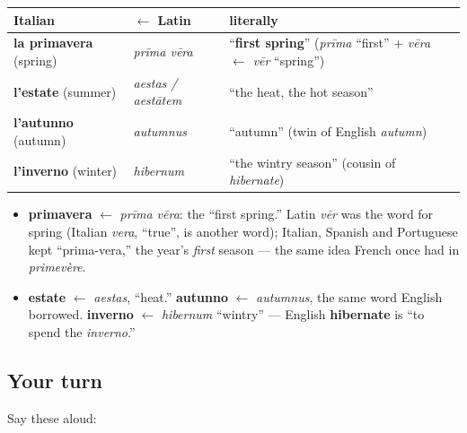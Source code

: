 \begin{cousinweb}
\noindent
\begin{tabularx}{\linewidth}{@{}>{\raggedright\arraybackslash}X>{\raggedright\arraybackslash}X>{\raggedright\arraybackslash}X@{}}
\toprule
\textbf{Italian} & \textbf{$\leftarrow$ Latin} & \textbf{literally} \\
\midrule
\textbf{la primavera} (spring) & \emph{prīma vēra} & \textquotedblleft{}\textbf{first spring}\textquotedblright{} (\emph{prīma} \textquotedblleft{}first\textquotedblright{} + \emph{vēra} $\leftarrow$ \emph{vēr} \textquotedblleft{}spring\textquotedblright{}) \\
\textbf{l'estate} (summer) & \emph{aestas / aestātem} & \textquotedblleft{}the heat, the hot season\textquotedblright{} \\
\textbf{l'autunno} (autumn) & \emph{autumnus} & \textquotedblleft{}autumn\textquotedblright{} (twin of English \emph{autumn}) \\
\textbf{l'inverno} (winter) & \emph{hibernum} & \textquotedblleft{}the wintry season\textquotedblright{} (cousin of \emph{hibernate}) \\
\bottomrule
\end{tabularx}

\begin{itemize}
\raggedright
  \item \textbf{primavera} $\leftarrow$ \emph{prīma vēra}: the \textquotedblleft{}first spring.\textquotedblright{} Latin \emph{vēr} was the word for spring (Italian \emph{vera}, \textquotedblleft{}true\textquotedblright{}, is another word); Italian, Spanish and Portuguese kept \textquotedblleft{}prima-vera,\textquotedblright{} the year's \emph{first} season — the same idea French once had in \emph{primevère}.
  \item \textbf{estate} $\leftarrow$ \emph{aestas}, \textquotedblleft{}heat.\textquotedblright{} \textbf{autunno} $\leftarrow$ \emph{autumnus}, the same word English borrowed. \textbf{inverno} $\leftarrow$ \emph{hibernum} \textquotedblleft{}wintry\textquotedblright{} — English \textbf{hibernate} is \textquotedblleft{}to spend the \emph{inverno}.\textquotedblright{}
\end{itemize}
\end{cousinweb}

\subsection*{Your turn}
Say these aloud:

